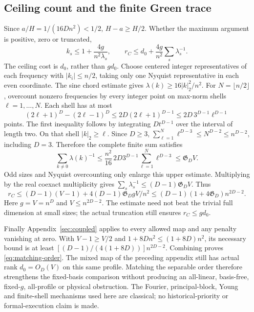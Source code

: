 \subsection{Ceiling count and the finite Green trace}
Since $a/H=1/(16Dn^2)<1/2$, $H-a\ge H/2$.
Whether the maximum argument is positive, zero or truncated,
\[
 k_s\le1+\frac{4g}{n^2\lambda_s},\qquad
 r_C\le d_0+\frac{4g}{n^2}\sum_s\lambda_s^{-1}.
\]
The ceiling cost is $d_0$, rather than $gd_0$.
Choose centered integer representatives of each frequency with
$|k_i|\le n/2$, taking only one Nyquist representative in each even
coordinate. The sine chord estimate gives
$\lambda(k)\ge16|k|_2^2/n^2$.
For $N=\lfloor n/2\rfloor$, overcount nonzero frequencies by every
integer point on max-norm shells $\ell=1,\ldots,N$.
Each shell has at most
\[
 (2\ell+1)^D-(2\ell-1)^D
 \le2D(2\ell+1)^{D-1}
 \le2D\,3^{D-1}\ell^{D-1}
\]
points. The first inequality follows by integrating $Dt^{D-1}$ over
the interval of length two. On that shell $|k|_2\ge\ell$.
Since $D\ge3$,
$\sum_{\ell=1}^N\ell^{D-3}\le N^{D-2}\le n^{D-2}$,
including $D=3$. Therefore the complete finite sum satisfies
\begin{equation}\label{eq:finite-green}
 \sum_{k\ne0}\lambda(k)^{-1}
 \le\frac{n^2}{16}\,2D3^{D-1}\sum_{\ell=1}^N\ell^{D-3}
 \le\mathfrak G_DV.
\end{equation}
Odd sizes and Nyquist overcounting only enlarge this upper estimate.
Multiplying by the real coexact multiplicity gives
$\sum_s\lambda_s^{-1}\le(D-1)\mathfrak G_DV$. Thus
\[
 r_C\le(D-1)(V-1)+4(D-1)\mathfrak G_DgV/n^2
 \le(D-1)(1+4\mathfrak G_D)n^{2D-2}.
\]
Here $g=V=n^D$ and $V\le n^{2D-2}$. The estimate need not beat the
trivial full dimension at small sizes; the actual truncation still
ensures $r_C\le gd_0$.

Finally Appendix~\ref{sec:coupled} applies to every allowed map and any
penalty vanishing at zero. With $V-1\ge V/2$ and
$1+8Dn^2\le(1+8D)n^2$, its necessary bound is at least
$[(D-1)/(4(1+8D))]n^{2D-2}$. Combining proves
\eqref{eq:matching-order}. The mixed map of the preceding appendix still
has actual rank $d_0=O_D(V)$ on this same profile. Matching the separable
order therefore strengthens the fixed-basis comparison without producing
an all-linear, basis-free, fixed-$g$, all-profile or physical obstruction.
The Fourier, principal-block, Young and finite-shell mechanisms used here
are classical; no historical-priority or formal-execution claim is made.
